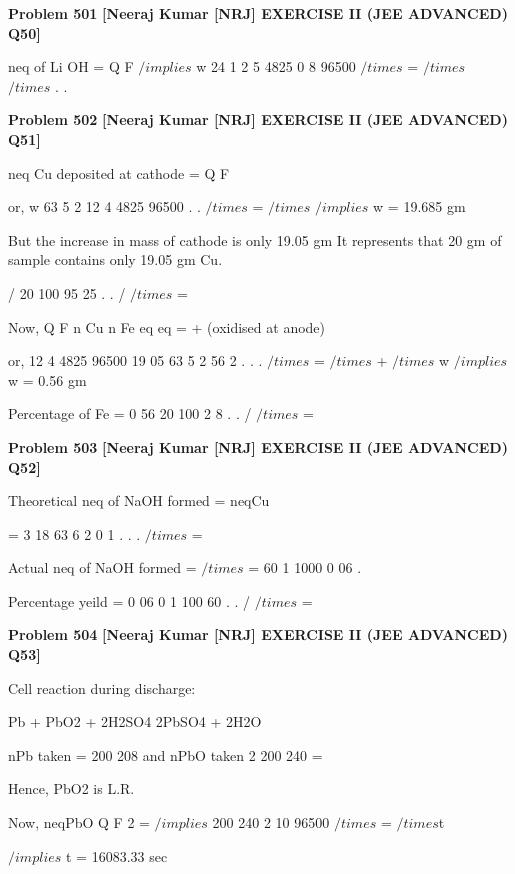 \begin{problembox}
\textbf{Problem 501} \hfill \textbf{[Neeraj Kumar [NRJ] EXERCISE II (JEE ADVANCED) Q50]}
\label{q:ext-nrj_all_questions-501}

neq of Li OH = Q
F $/implies$ w
24
1
2 5
4825
0 8
96500
$/times$ =
$/times$
$/times$
.
.
\end{problembox}

\begin{problembox}
\textbf{Problem 502} \hfill \textbf{[Neeraj Kumar [NRJ] EXERCISE II (JEE ADVANCED) Q51]}
\label{q:ext-nrj_all_questions-502}

neq Cu deposited at cathode = Q
F 
 
 or, w
63 5
2
12 4
4825
96500
.
.
$/times$
=
$/times$
 $/implies$ w = 19.685 gm
 
 But the increase in mass of cathode is only 19.05 
gm It represents that 20 gm of sample contains 
only 19.05 gm Cu.
 
   /%
20
100
95 25
.
.
/%
$/times$
=
 
 Now, Q
F
n Cu
n Fe
eq
eq
=
+
 (oxidised at anode)
 
 or, 12 4
4825
96500
19 05
63 5
2
56
2
.
.
.
$/times$
=
$/times$
+
$/times$
w
 $/implies$ w = 0.56 gm
 
   Percentage of Fe = 0 56
20
100
2 8
.
. /%
$/times$
=
\end{problembox}

\begin{problembox}
\textbf{Problem 503} \hfill \textbf{[Neeraj Kumar [NRJ] EXERCISE II (JEE ADVANCED) Q52]}
\label{q:ext-nrj_all_questions-503}

Theoretical neq of NaOH formed = neqCu 
 
  
 
 
 
= 3 18
63 6
2
0 1
.
.
.
$/times$
=
 
 Actual neq of NaOH formed =
$/times$
=
60
1
1000
0 06
.
 
   Percentage yeild = 
0 06
0 1 100
60
.
.
/%
$/times$
=
\end{problembox}

\begin{problembox}
\textbf{Problem 504} \hfill \textbf{[Neeraj Kumar [NRJ] EXERCISE II (JEE ADVANCED) Q53]}
\label{q:ext-nrj_all_questions-504}

Cell reaction during discharge:
 
 Pb + PbO2 + 2H2SO4 
 2PbSO4 + 2H2O
 
 nPb taken = 200
208 and nPbO taken
2
200
240
=
 
 
 Hence, PbO2 is L.R.
 
 Now, neqPbO
Q
F
2 =
 $/implies$ 200
240
2
10
96500
$/times$
=
$/times$t 
 
 $/implies$ t = 16083.33 sec
\end{problembox}

